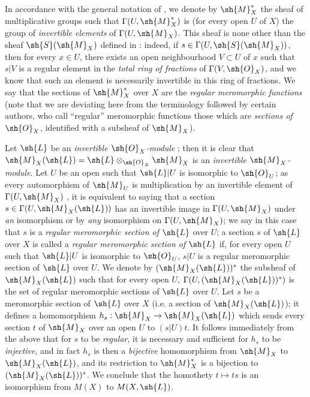 \begin{env}[20.1.8]
\label{IV.20.1.8}
In accordance with the general notation of , we denote by $\sh{M}_X^*$ the sheaf of multiplicative groups such that $\Gamma(U,\sh{M}_X^*)$ is (for every open $U$ of $X$) the group of \emph{invertible elements} of $\Gamma(U,\sh{M}_X)$.
This sheaf is none other than the sheaf $\sh{S}(\sh{M}_X)$ defined in :
indeed, if $s\in\Gamma(U,\sh{S}(\sh{M}_X))$, then for every $x\in U$, there exists an open neighbourhood $V\subset U$ of $x$ such that $s|V$ is a regular element in the \emph{total ring of fractions} of $\Gamma(V,\sh{O}_X)$, and we know that such an element is necessarily invertible in this ring of fractions.
We say that the sections of $\sh{M}_X^*$ over $X$ are the \emph{regular meromorphic functions} (note that we are deviating here from the terminology followed by certain authors, who call ``regular'' meromorphic functions those which are \emph{sections of $\sh{O}_X$}, identified with a subsheaf of $\sh{M}_X$).

Let $\sh{L}$ be an \emph{invertible $\sh{O}_X$-module} ;
then it is clear that $\sh{M}_X(\sh{L})=\sh{L}\otimes_{\sh{O}_X}\sh{M}_X$
is an \emph{invertible $\sh{M}_X$-module}.
Let $U$ be an open such that $\sh{L}|U$ is isomorphic to $\sh{O}_U$;
as every automorphism of $\sh{M}_U$ is multiplication by an invertible element of $\Gamma(U,\sh{M}_X)$ , it is equivalent to saying that a section $s\in\Gamma(U,\sh{M}_X(\sh{L}))$ has an invertible image in $\Gamma(U,\sh{M}_X)$ under \emph{an} isomorphism or by \emph{any} isomorphism on $\Gamma(U,\sh{M}_X)$;
we say in this case that $s$ is a \emph{regular meromorphic section of $\sh{L}$} over $U$;
a section $s$ of $\sh{L}$ over $X$ is called a \emph{regular meromorphic section of $\sh{L}$} if, for every open $U$ such that $\sh{L}|U$ is isomorphic to $\sh{O}_U$, $s|U$ is a regular meromorphic section of $\sh{L}$ over $U$.
We denote by $(\sh{M}_X(\sh{L}))^*$ the subsheaf of $\sh{M}_X(\sh{L})$ such that for every open $U$, $\Gamma(U,(\sh{M}_X(\sh{L}))^*)$ is the set of regular meromorphic sections of $\sh{L}$ over $U$.
Let $s$ be a meromorphic section of $\sh{L}$ over $X$ (i.e. a section of $\sh{M}_X(\sh{L})$);
it defines a homomorphism $h_s:\sh{M}_X\to\sh{M}_X(\sh{L})$ which sends every section $t$ of $\sh{M}_X$ over an open $U$ to $(s|U)t$.
It follows immediately from the above that for $s$ to be \emph{regular}, it is necessary and sufficient for $h_s$ to be \emph{injective}, and in fact $h_s$ is then a \emph{bijective} homomorphism from $\sh{M}_X$ to $\sh{M}_X(\sh{L})$, and its restriction to $\sh{M}_X^*$ is a bijection to $(\sh{M}_X(\sh{L}))^*$.
We conclude that the homothety $t\mapsto ts$ is an isomorphism from $M(X)$ to $M(X,\sh{L})$.
\end{env}

